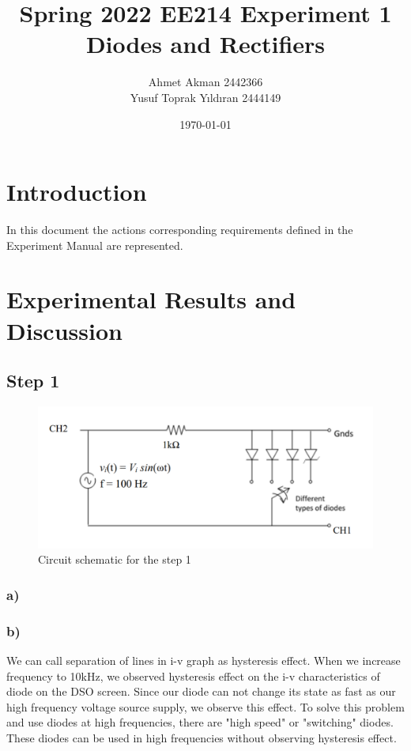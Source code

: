 \documentclass[letterpaper,12pt]{article}
\begin{document}
\title{Spring 2022 EE214 Experiment 1  \protect\\ Diodes and Rectifiers}
\author{Ahmet Akman 2442366 \protect\\ Yusuf Toprak Yıldıran 2444149}
\date{\today}
\maketitle
\tableofcontents
\section{Introduction}
In this document the actions corresponding requirements defined in the Experiment Manual are  represented.

\section{Experimental Results and Discussion}

\subsection{Step 1}

\begin{figure}[H]
\centering
\includegraphics[width=1\textwidth]{1_1.png}
\caption{Circuit schematic for the step 1}
\end{figure} 

\subsubsection{a)}
\subsubsection{b)}


We can call separation of lines in i-v graph as hysteresis effect. When we increase frequency to 10kHz, we observed hysteresis effect on the i-v characteristics of diode on the DSO screen. Since our diode can not change its state as fast as our high frequency voltage source supply, we observe this effect. To solve this problem and use diodes at high frequencies, there are "high speed" or "switching" diodes. These diodes can be used in high frequencies without observing hysteresis effect.
\end{document}
